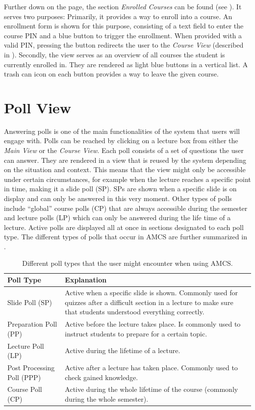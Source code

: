 Further down on the page, the section \emph{Enrolled Courses} can be found (see ). It serves two purposes: Primarily, it provides a way to enroll into a course. An enrollment form is shown for this purpose, consisting of a text field to enter the course PIN and a blue button to trigger the enrollment. When provided with a valid PIN, pressing the button redirects the user to the \emph{Course View} (described in ).
Secondly, the view serves as an overview of all courses the student is currently enrolled in. They are rendered as light blue buttons in a vertical list. A trash can icon on each button provides a way to leave the given course.

\section{Poll View}
\label{section:soa:pollview}
Answering polls is one of the main functionalities of the system that users will engage with.
Polls can be reached by clicking on a lecture box from either the \emph{Main View} or the \emph{Course View}.
Each poll consists of a set of questions the user can answer. They are rendered in a view that is reused by the system depending on the situation and context. This means that the view might only be accessible under certain circumstances, for example when the lecture reaches a specific point in time, making it a slide poll (SP). SPs are shown when a specific slide is on display and can only be answered in this very moment. Other types of polls include “global” course polls (CP) that are always accessible during the semester and lecture polls (LP) which can only be answered during the life time of a lecture.
Active polls are displayed all at once in sections designated to each poll type.
The different types of polls that occur in AMCS are further summarized in .

\begin{table}[H]
	{\renewcommand{\arraystretch}{2}
		\begin{tabular}{ | p{5cm} | p{10cm} |}
			\hline
			Poll Type & Explanation \\ \hline \hline
			Slide Poll (SP) & Active when a specific slide is shown. Commonly used for quizzes after a difficult section in a lecture to make sure that students understood everything correctly. \\ \hline
			Preparation Poll (PP) & Active before the lecture takes place. Is commonly used to instruct students to prepare for a certain topic. \\ \hline
			Lecture Poll (LP) & Active during the lifetime of a lecture. \\ \hline
			Post Processing Poll (PPP) & Active after a lecture has taken place. Commonly used to check gained knowledge. \\ \hline
			Course Poll (CP) & Active during the whole lifetime of the course (commonly during the whole semester). \\
			\hline
		\end{tabular}
	}
	\caption{Different poll types that the user might encounter when using AMCS.}
	\label{tab:pollTypes}
\end{table}

